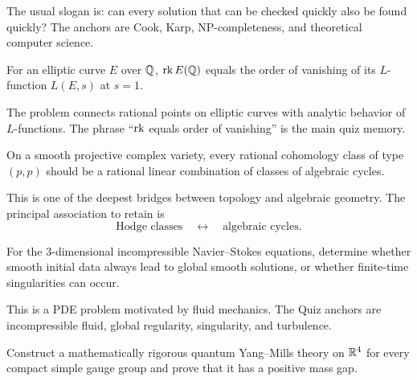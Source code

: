     \begin{remark}
        The usual slogan is: can every solution that can be checked quickly also
        be found quickly? The anchors are Cook, Karp, NP-completeness, and
        theoretical computer science.
    \end{remark}

    \begin{conjecture}
        For an elliptic curve $E$ over $\mathbb{Q}$, $\operatorname{rk} E(\mathbb{Q})$ equals the order
        of vanishing of its $L$-function $L(E,s)$ at $s=1$.
    \end{conjecture}

    \begin{remark}
        The problem connects rational points on elliptic curves with analytic
        behavior of $L$-functions. The phrase ``$\operatorname{rk}$ equals order of vanishing''
        is the main quiz memory.
    \end{remark}

    \begin{conjecture}
        On a smooth projective complex variety, every rational cohomology class
        of type $(p,p)$ should be a rational linear combination of classes of
        algebraic cycles.
    \end{conjecture}

    \begin{remark}
        This is one of the deepest bridges between topology and algebraic
        geometry. The principal association to retain is
        \[
            \text{Hodge classes} \quad\longleftrightarrow\quad
            \text{algebraic cycles}.
        \]
    \end{remark}

    \begin{openproblem}
        For the $3$-dimensional incompressible Navier--Stokes equations,
        determine whether smooth initial data always lead to global smooth
        solutions, or whether finite-time singularities can occur.
    \end{openproblem}

    \begin{remark}
        This is a PDE problem motivated by fluid mechanics. The Quiz anchors
        are incompressible fluid, global regularity, singularity, and turbulence.
    \end{remark}

    \begin{openproblem}
        Construct a mathematically rigorous quantum Yang--Mills theory on
        $\mathbb{R}^4$ for every compact simple gauge group and prove that it has a
        positive mass gap.
    \end{openproblem}

